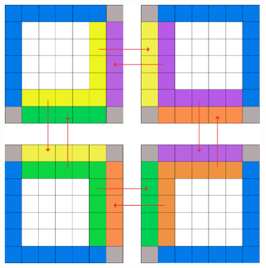 \begin{figure}[h!]
  \centering
  \includegraphics[scale=0.15]{figures/domain-overlap-comms.png}
  \caption{\label{fig:comms} }
\end{figure}



